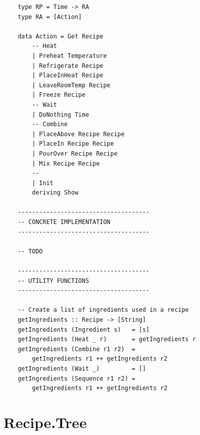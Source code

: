 \documentclass[11pt]{article}
\begin{document}
\begin{tt}
\begin{lstlisting}
    type RP = Time -> RA
    type RA = [Action]
    
    data Action = Get Recipe
        -- Heat
        | Preheat Temperature
        | Refrigerate Recipe
        | PlaceInHeat Recipe
        | LeaveRoomTemp Recipe
        | Freeze Recipe
        -- Wait
        | DoNothing Time
        -- Combine
        | PlaceAbove Recipe Recipe
        | PlaceIn Recipe Recipe
        | PourOver Recipe Recipe
        | Mix Recipe Recipe
        --
        | Init
        deriving Show
    
    -------------------------------------
    -- CONCRETE IMPLEMENTATION
    -------------------------------------
    
    -- TODO
    
    -------------------------------------
    -- UTILITY FUNCTIONS
    -------------------------------------
    
    -- Create a list of ingredients used in a recipe
    getIngredients :: Recipe -> [String]
    getIngredients (Ingredient s)   = [s]
    getIngredients (Heat _ r)       = getIngredients r
    getIngredients (Combine r1 r2)  =
        getIngredients r1 ++ getIngredients r2
    getIngredients (Wait _)         = []
    getIngredients (Sequence r1 r2) =
        getIngredients r1 ++ getIngredients r2
    \end{lstlisting}
    \end{tt}

    \section{Recipe.Tree}
\end{document}
